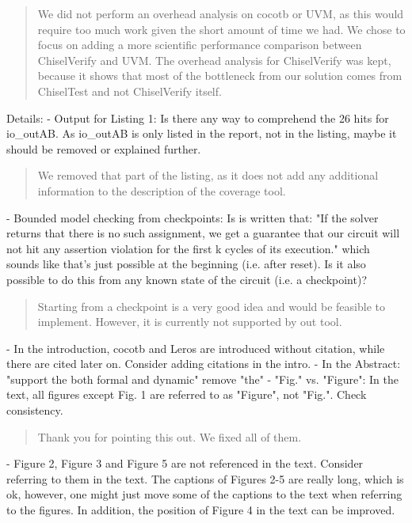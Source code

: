 \documentclass{article}
\newcommand{\martin}[1]{{\color{blue} Martin: #1\\}}
\newcommand{\reply}[1]{{\color{blue} #1}}
\begin{document}
\begin{quote}
\reply{We did not perform an overhead analysis on cocotb or UVM, as this would require too much work given the short amount of time we had.
We chose to focus on adding a more scientific performance comparison between ChiselVerify and UVM.
The overhead analysis for ChiselVerify was kept, because it shows that most of the bottleneck from our solution comes from ChiselTest and not ChiselVerify itself.
}
\end{quote}

Details:
- Output for Listing 1: Is there any way to comprehend the 26 hits for io\_outAB. As io\_outAB is only listed in the report, not in the listing, maybe it should be removed or explained further.

\begin{quote}
\reply{We removed that part of the listing, as it does not add any additional information to the description of the coverage tool.}
\end{quote}

- Bounded model checking from checkpoints: Is is written that: "If the solver returns that there is no such assignment, we get a guarantee that our circuit will not hit any assertion violation for the first k cycles of its execution." which sounds like that's just possible at the beginning (i.e. after reset). Is it also possible to do this from any known state of the circuit (i.e. a checkpoint)?

\begin{quote}
\reply{
Starting from a checkpoint is a very good idea and would be feasible to implement. However, it is currently not supported by out tool.
}
\end{quote}

- In the introduction, cocotb and Leros are introduced without citation, while there are cited later on. Consider adding citations in the intro.
- In the Abstract: "support the both formal and dynamic" remove "the"
- "Fig." vs. "Figure": In the text, all figures except Fig. 1 are referred to as "Figure", not "Fig.". Check consistency.

\begin{quote}
\reply{Thank you for pointing this out. We fixed all of them.}
\end{quote}

- Figure 2, Figure 3 and Figure 5 are not referenced in the text. Consider referring to them in the text. The captions of Figures 2-5 are really long, which is ok, however, one might just move some of the captions to the text when referring to the figures. In addition, the position of Figure 4 in the text can be improved. 
\end{document}
